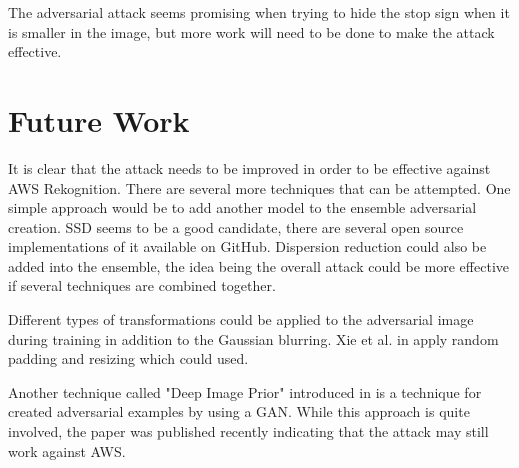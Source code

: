 \documentclass{article}
\begin{document}
The adversarial attack seems promising when trying to hide the stop sign when it is smaller in the image, but more work will need to be done to make the attack effective.

\section{Future Work}
It is clear that the attack needs to be improved in order to be effective against AWS Rekognition. There are several more techniques that can be attempted. One simple approach would be to add another model to the ensemble adversarial creation. SSD \cite{Liu2016} seems to be a good candidate, there are several open source implementations of it available on GitHub. Dispersion reduction could also be added into the ensemble, the idea being the overall attack could be more effective if several techniques are combined together.

Different types of transformations could be applied to the adversarial image during training in addition to the Gaussian blurring. Xie et al. in \cite{xie2019improving} apply random padding and resizing which could used.

Another technique called "Deep Image Prior" introduced in \cite{gittings2019robust} is a technique for created adversarial examples by using a GAN. While this approach is quite involved, the paper was published recently indicating that the attack may still work against AWS.

\clearpage


\end{document}
